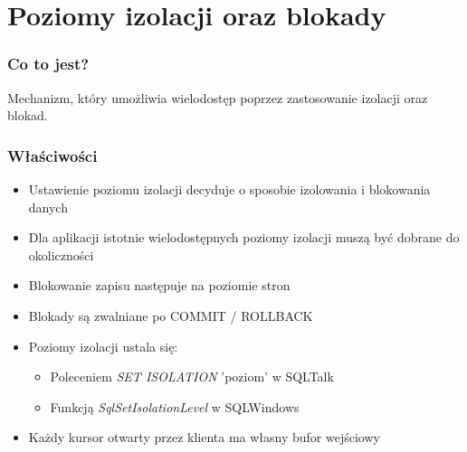 \documentclass[a4paper,twoside]{article}
\begin{document}
  	\part*{Poziomy izolacji oraz blokady}
  	
  	\section*{Co to jest?}
  	Mechanizm, który umożliwia wielodostęp poprzez zastosowanie izolacji oraz blokad.
  	
  	\section*{Właściwości}
  	\begin{itemize}
  		\item Ustawienie poziomu izolacji decyduje o sposobie izolowania i blokowania danych 
  		\item Dla aplikacji istotnie wielodostępnych poziomy izolacji muszą być dobrane do okoliczności 
  		\item Blokowanie zapisu następuje na poziomie stron 
  		\item Blokady są zwalniane po COMMIT / ROLLBACK 
  		\item Poziomy izolacji ustala się:
  		\begin{itemize}
  			\item Poleceniem \emph{SET ISOLATION} 'poziom' w SQLTalk 
  			\item Funkcją \emph{SqlSetIsolationLevel} w SQLWindows
  		\end{itemize}
  		\item Każdy kursor otwarty przez klienta ma własny bufor wejściowy
  	\end{itemize}
  	
\end{document}
